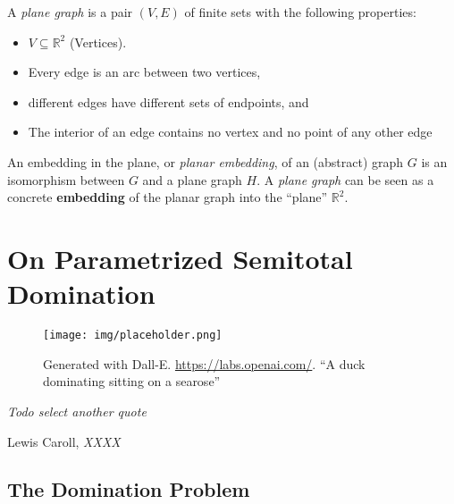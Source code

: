 \begin{graphclass}[Planar]

A \textit{plane graph} is a pair $(V,E)$ of finite sets with the following properties:

\begin{itemize}
    \item $V \subseteq \mathbb{R}^2$ (Vertices).
    \vspace{-2mm}
    \item Every edge is an arc between two vertices, 
    \vspace{-2mm}
    \item different edges have different sets of endpoints, and
    \vspace{-2mm}
    \item The interior of an edge contains no vertex and no point of any other edge
\end{itemize}

An embedding in the plane, or \textit{planar embedding}, of an (abstract) graph $G$ is an isomorphism between $G$ and a plane graph $H$. A \textit{plane graph} can be seen as a concrete \textbf{embedding} of the planar graph into the ``plane'' $\mathbb{R}^2$.

\end{graphclass}



\chapter{On Parametrized Semitotal Domination}\label{ch:semitotal-domination}

\vspace*{-50pt}

\begin{figure}[ht]
        \texttt{[image: img/placeholder.png]}
        \captionsetup{textformat=empty,labelformat=blank}
        \caption{Generated with Dall-E. \url{https://labs.openai.com/}. ``A duck dominating sitting on a searose''}
\end{figure}

\epigraph{\itshape Todo select another quote}{Lewis Caroll, \textit{XXXX}}



\section{The Domination Problem}

